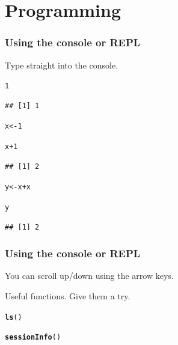\documentclass{beamer}\usepackage{graphicx, color}
\makeatletter
\newcommand{\hlfunctioncall}[1]{\textcolor[rgb]{0.501960784313725,0,0.329411764705882}{\textbf{#1}}}%
\newenvironment{kframe}{%
 \def\at@end@of@kframe{}%
 \ifinner\ifhmode%
  \def\at@end@of@kframe{\end{minipage}}%
  \begin{minipage}{\columnwidth}%
 \fi\fi%
 \def\FrameCommand##1{\hskip\@totalleftmargin \hskip-\fboxsep
 \colorbox{shadecolor}{##1}\hskip-\fboxsep
     \hskip-\linewidth \hskip-\@totalleftmargin \hskip\columnwidth}%
 \MakeFramed {\advance\hsize-\width
   \@totalleftmargin\z@ \linewidth\hsize
   \@setminipage}}%
 {\par\unskip\endMakeFramed%
 \at@end@of@kframe}
\newenvironment{knitrout}{}{} %
\makeatother
\begin{document}
\section{Programming}
\begin{frame}[fragile]
  \frametitle{Using the console or REPL}

  Type straight into the console.

\begin{knitrout}\small
{}\color{fgcolor}\begin{kframe}
\begin{alltt}
1
\end{alltt}
\begin{verbatim}
## [1] 1
\end{verbatim}
\begin{alltt}

x <- 1

x + 1
\end{alltt}
\begin{verbatim}
## [1] 2
\end{verbatim}
\begin{alltt}

y <- x + x

y
\end{alltt}
\begin{verbatim}
## [1] 2
\end{verbatim}
\end{kframe}
\end{knitrout}


\end{frame}

\begin{frame}[fragile]
  \frametitle{Using the console or REPL}

  You can scroll up/down using the arrow keys.

  Useful functions. Give them a try.
\begin{knitrout}\small
{}\color{fgcolor}\begin{kframe}
\begin{alltt}
\hlfunctioncall{ls}()

\hlfunctioncall{sessionInfo}()
\end{alltt}
\end{kframe}
\end{knitrout}

\end{frame}
\end{document}
